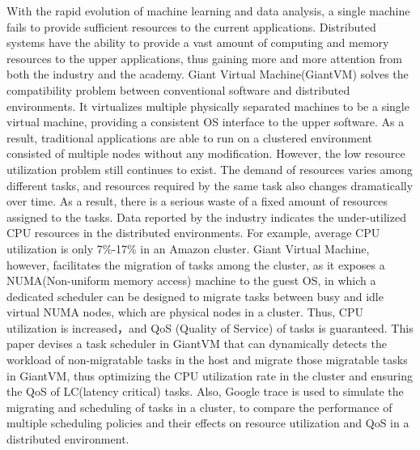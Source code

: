 \begin{englishabstract}


With the rapid evolution of machine learning and data analysis, a single machine fails to provide sufficient resources to the current applications. Distributed systems have the ability to provide a vast amount of computing and memory resources to the upper applications, thus gaining more and more attention from both the industry and the academy. Giant Virtual Machine(GiantVM) solves the compatibility problem between conventional software and distributed environments. It virtualizes multiple physically separated machines to be a single virtual machine, providing a consistent OS interface to the upper software. As a result, traditional applications are able to run on a clustered environment consisted of multiple nodes without any modification. However, the low resource utilization problem still continues to exist. The demand of resources varies among different tasks, and resources required by the same task also changes dramatically over time. As a result, there is a serious waste of a fixed amount of resources assigned to the tasks. Data reported by the industry indicates the under-utilized CPU resources in the distributed environments. For example, average CPU utilization is only 7\%-17\% in an Amazon cluster. Giant Virtual Machine, however, facilitates the migration of tasks among the cluster, as it exposes a NUMA(Non-uniform memory access) machine to the guest OS, in which a dedicated scheduler can be designed to migrate tasks between busy and idle virtual NUMA nodes, which are physical nodes in a cluster. Thus, CPU utilization is increased，and QoS (Quality of Service) of tasks is guaranteed. This paper devises a task scheduler in GiantVM that can dynamically detects the workload of non-migratable tasks in the host and migrate those migratable tasks in GiantVM, thus optimizing the CPU utilization rate in the cluster and ensuring the QoS of LC(latency critical) tasks. Also, Google trace is used to simulate the migrating and scheduling of tasks in a cluster, to compare the performance of multiple scheduling policies and their effects on resource utilization and QoS in a distributed environment.

\end{englishabstract}

